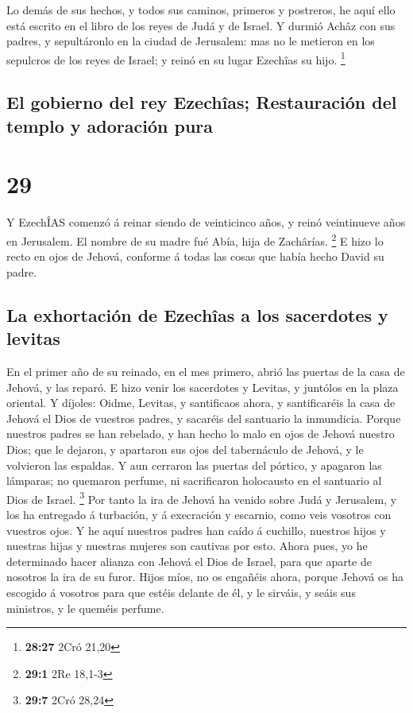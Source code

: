  Lo demás de sus hechos, y todos sus caminos, primeros y
postreros, he aquí ello está escrito en el libro de los reyes de Judá y
de Israel.  Y durmió Achâz con sus padres, y sepultáronlo
en la ciudad de Jerusalem: mas no le metieron en los sepulcros de los
reyes de Israel; y reinó en su lugar Ezechîas su hijo. \footnote{\textbf{28:27}
  2Cró 21,20}

\hypertarget{el-gobierno-del-rey-ezechuxeeas-restauraciuxf3n-del-templo-y-adoraciuxf3n-pura}{%
\subsection{El gobierno del rey Ezechîas; Restauración del templo y
adoración
pura}\label{el-gobierno-del-rey-ezechuxeeas-restauraciuxf3n-del-templo-y-adoraciuxf3n-pura}}

\hypertarget{section-28}{%
\section{29}\label{section-28}}

 Y EzechÎAS comenzó á reinar siendo de veinticinco años, y
reinó veintinueve años en Jerusalem. El nombre de su madre fué Abía,
hija de Zachârías. \footnote{\textbf{29:1} 2Re 18,1-3}  E
hizo lo recto en ojos de Jehová, conforme á todas las cosas que había
hecho David su padre.

\hypertarget{la-exhortaciuxf3n-de-ezechuxeeas-a-los-sacerdotes-y-levitas}{%
\subsection{La exhortación de Ezechîas a los sacerdotes y
levitas}\label{la-exhortaciuxf3n-de-ezechuxeeas-a-los-sacerdotes-y-levitas}}

 En el primer año de su reinado, en el mes primero, abrió
las puertas de la casa de Jehová, y las reparó.  E hizo
venir los sacerdotes y Levitas, y juntólos en la plaza oriental.
 Y díjoles: Oidme, Levitas, y santificaos ahora, y
santificaréis la casa de Jehová el Dios de vuestros padres, y sacaréis
del santuario la inmundicia.  Porque nuestros padres se
han rebelado, y han hecho lo malo en ojos de Jehová nuestro Dios; que le
dejaron, y apartaron sus ojos del tabernáculo de Jehová, y le volvieron
las espaldas.  Y aun cerraron las puertas del pórtico, y
apagaron las lámparas; no quemaron perfume, ni sacrificaron holocausto
en el santuario al Dios de Israel. \footnote{\textbf{29:7} 2Cró 28,24}
 Por tanto la ira de Jehová ha venido sobre Judá y
Jerusalem, y los ha entregado á turbación, y á execración y escarnio,
como veis vosotros con vuestros ojos.  Y he aquí nuestros
padres han caído á cuchillo, nuestros hijos y nuestras hijas y nuestras
mujeres son cautivas por esto.  Ahora pues, yo he
determinado hacer alianza con Jehová el Dios de Israel, para que aparte
de nosotros la ira de su furor.  Hijos míos, no os
engañéis ahora, porque Jehová os ha escogido á vosotros para que estéis
delante de él, y le sirváis, y seáis sus ministros, y le queméis
perfume.

